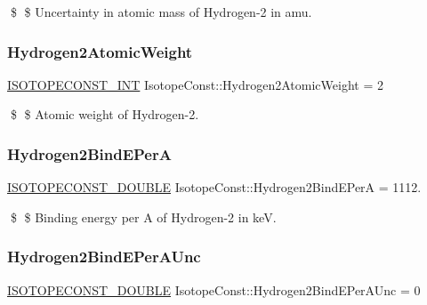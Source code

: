 \$ \$ Uncertainty in atomic mass of Hydrogen-\/2 in amu. \mbox{\label{group___isotope_const-_hydrogen-_h2_gadb1755730d3b7333024097bb9b509f65}} 
\subsubsection{\texorpdfstring{Hydrogen2\+Atomic\+Weight}{Hydrogen2AtomicWeight}}
{\footnotesize\ttfamily \mbox{\hyperlink{group___isotope_const-_macros_ga5f18360b3e99483a35c32d789e62621c}{I\+S\+O\+T\+O\+P\+E\+C\+O\+N\+S\+T\+\_\+\+I\+NT}} Isotope\+Const\+::\+Hydrogen2\+Atomic\+Weight = 2}

\$ \$ Atomic weight of Hydrogen-\/2. \mbox{\label{group___isotope_const-_hydrogen-_h2_ga866b59abe536ec52abfde258fd33177d}} 
\subsubsection{\texorpdfstring{Hydrogen2\+Bind\+E\+PerA}{Hydrogen2BindEPerA}}
{\footnotesize\ttfamily \mbox{\hyperlink{group___isotope_const-_macros_ga8f45a7272ce02c0b4c65c44636ed719a}{I\+S\+O\+T\+O\+P\+E\+C\+O\+N\+S\+T\+\_\+\+D\+O\+U\+B\+LE}} Isotope\+Const\+::\+Hydrogen2\+Bind\+E\+PerA = 1112.}

\$ \$ Binding energy per A of Hydrogen-\/2 in keV. \mbox{\label{group___isotope_const-_hydrogen-_h2_ga6eb5bfd3a64fcb8bc14a4976904ea42e}} 
\subsubsection{\texorpdfstring{Hydrogen2\+Bind\+E\+Per\+A\+Unc}{Hydrogen2BindEPerAUnc}}
{\footnotesize\ttfamily \mbox{\hyperlink{group___isotope_const-_macros_ga8f45a7272ce02c0b4c65c44636ed719a}{I\+S\+O\+T\+O\+P\+E\+C\+O\+N\+S\+T\+\_\+\+D\+O\+U\+B\+LE}} Isotope\+Const\+::\+Hydrogen2\+Bind\+E\+Per\+A\+Unc = 0}

